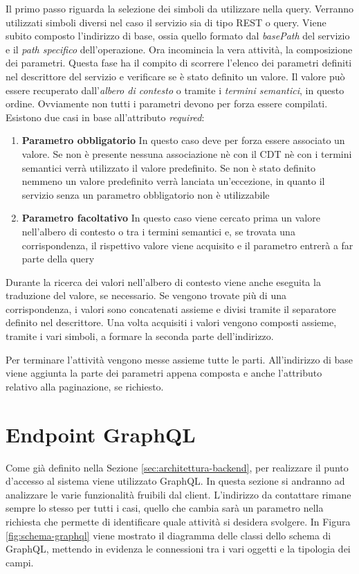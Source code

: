Il primo passo riguarda la selezione dei simboli da utilizzare nella query. Verranno utilizzati simboli diversi nel caso il servizio sia di tipo REST o query. Viene subito composto l'indirizzo di base, ossia quello formato dal \emph{basePath} del servizio e il \emph{path specifico} dell'operazione. Ora incomincia la vera attività, la composizione dei parametri. Questa fase ha il compito di scorrere l'elenco dei parametri definiti nel descrittore del servizio e verificare se è stato definito un valore. Il valore può essere recuperato dall'\emph{albero di contesto} o tramite i \emph{termini semantici}, in questo ordine. Ovviamente non tutti i parametri devono per forza essere compilati. Esistono due casi in base all'attributo \emph{required}:

\begin{enumerate}
	\item \textbf{Parametro obbligatorio}
	In questo caso deve per forza essere associato un valore. Se non è presente nessuna associazione nè con il CDT nè con i termini semantici verrà utilizzato il valore predefinito. Se non è stato definito nemmeno un valore predefinito verrà lanciata un'eccezione, in quanto il servizio senza un parametro obbligatorio non è utilizzabile
	\item \textbf{Parametro facoltativo}
	In questo caso viene cercato prima un valore nell'albero di contesto o tra i termini semantici e, se trovata una corrispondenza, il rispettivo valore viene acquisito e il parametro entrerà a far parte della query
\end{enumerate}

Durante la ricerca dei valori nell'albero di contesto viene anche eseguita la traduzione del valore, se necessario. Se vengono trovate più di una corrispondenza, i valori sono concatenati assieme e divisi tramite il separatore definito nel descrittore. Una volta acquisiti i valori vengono composti assieme, tramite i vari simboli, a formare la seconda parte dell'indirizzo.

Per terminare l'attività vengono messe assieme tutte le parti. All'indirizzo di base viene aggiunta la parte dei parametri appena composta e anche l'attributo relativo alla paginazione, se richiesto.

\section{Endpoint GraphQL\label{sec:endpoint-graphql}}

Come già definito nella Sezione \ref{sec:architettura-backend}, per realizzare il punto d'accesso al sistema viene utilizzato GraphQL. In questa sezione si andranno ad analizzare le varie funzionalità fruibili dal client. L'indirizzo da contattare rimane sempre lo stesso per tutti i casi, quello che cambia sarà un parametro nella richiesta che permette di identificare quale attività si desidera svolgere. In Figura \ref{fig:schema-graphql} viene mostrato il diagramma delle classi dello schema di GraphQL, mettendo in evidenza le connessioni tra i vari oggetti e la tipologia dei campi.

